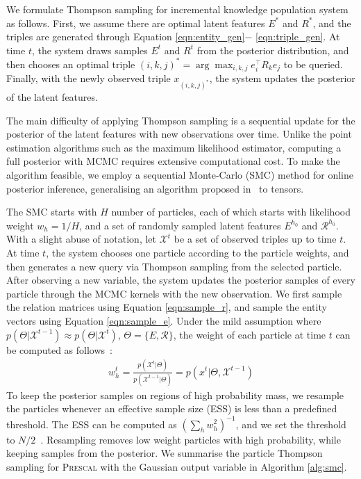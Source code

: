 We formulate Thompson sampling for incremental knowledge population
system as follows.
First, we assume there are optimal latent features $E^*$ and $R^*$, and
the triples are generated through Equation \ref{eqn:entity_gen}$-$
\ref{eqn:triple_gen}. At time $t$, the system draws samples $E^t$ and $R^t$
from the posterior distribution, and then chooses an optimal triple $(i,k,j)^*
= \arg\max_{i,k,j} e_i^\top R_k e_j$ to be queried. Finally, with the newly
observed triple $x_{(i,k,j)^*}$, the system updates the posterior of the latent
features.

The main difficulty of applying Thompson sampling is a sequential update for the posterior of the latent features with new observations over time. Unlike the point estimation algorithms such as
the maximum likelihood estimator, computing a full posterior with MCMC
requires extensive computational cost. To make the algorithm feasible, we employ a sequential Monte-Carlo (SMC) method for online posterior inference, generalising an algorithm proposed
in~\cite{kawale2015efficient} to tensors.

The SMC starts with $H$ number of particles, each of which starts with likelihood
weight $w_{h} = 1/H$, and a set of randomly sampled latent features $E^{h_0}$ and $\mathcal{R}^{h_0}$.
With a slight abuse of notation, let $\mathcal{X}^{t}$ be a set of observed triples up to time $t$.
At time $t$, the system chooses one particle according to the particle weights,
and then generates a new query via Thompson sampling from the selected particle.
After observing a new variable, the system updates the posterior samples of
every particle through the MCMC kernels with the new observation.
We first sample the relation matrices using Equation \ref{eqn:sample_r}, and sample the entity vectors using Equation \ref{eqn:sample_e}.
Under the mild assumption where
$p(\Theta | \mathcal{X}^{t-1}) \approx p(\Theta | \mathcal{X}^{t})$, $\Theta = \{E, \mathcal{R}\}$,
the weight of each particle at time $t$ can be computed as follows~\cite{del2006sequential}:
\begin{align}
w_{h}^{t} = \frac{p(\mathcal{X}^{t} | \Theta)}{p(\mathcal{X}^{t-1} | \Theta)}
 = p(x^{t} | \Theta, \mathcal{X}^{t-1})
\end{align}
To keep the posterior samples
on regions of high probability mass, we resample the particles whenever
an effective sample size (ESS) is less than a predefined threshold.
The ESS can be computed as $(\sum_h w_h^2)^{-1}$, and we set the threshold
to $N/2$~\cite{Doucet2011}. Resampling removes low weight particles with high probability,
while keeping samples from the posterior.
We summarise the particle Thompson sampling for \textsc{Prescal} with the
Gaussian output variable in Algorithm \ref{alg:smc}.

